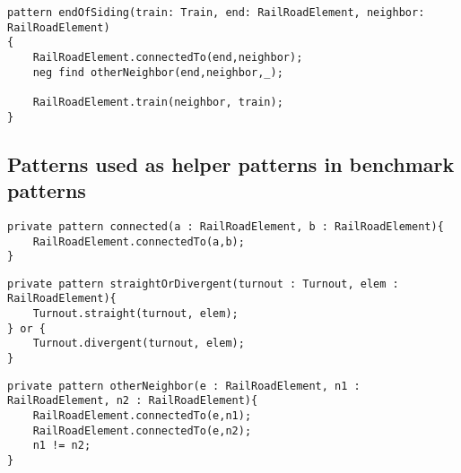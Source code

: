 \begin{lstlisting}[language = vql]
pattern endOfSiding(train: Train, end: RailRoadElement, neighbor: RailRoadElement)
{
	RailRoadElement.connectedTo(end,neighbor);
	neg find otherNeighbor(end,neighbor,_);
	
	RailRoadElement.train(neighbor, train);	
}
\end{lstlisting}

\clearpage

\subsection{Patterns used as helper patterns in benchmark patterns}


\begin{lstlisting}[language = vql]
private pattern connected(a : RailRoadElement, b : RailRoadElement){
	RailRoadElement.connectedTo(a,b);
}
\end{lstlisting}

\begin{lstlisting}[language = vql]
private pattern straightOrDivergent(turnout : Turnout, elem : RailRoadElement){
	Turnout.straight(turnout, elem);
} or {
	Turnout.divergent(turnout, elem);
}
\end{lstlisting}

\begin{lstlisting}[language = vql]
private pattern otherNeighbor(e : RailRoadElement, n1 : RailRoadElement, n2 : RailRoadElement){	
	RailRoadElement.connectedTo(e,n1);
	RailRoadElement.connectedTo(e,n2);
	n1 != n2;
}

\end{lstlisting}

\vfill


